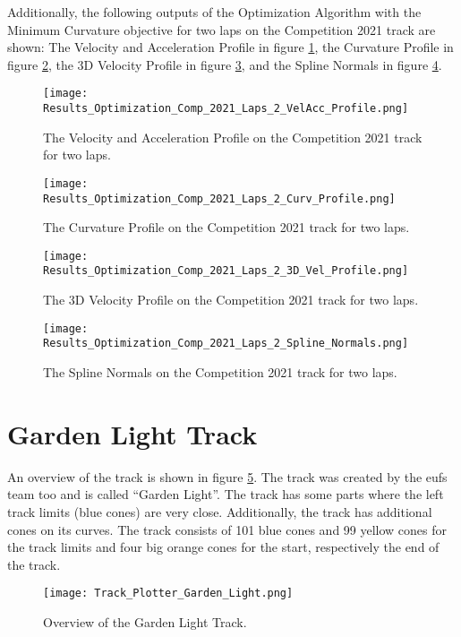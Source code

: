 Additionally, the following outputs of the Optimization Algorithm with the Minimum Curvature objective for two laps on the Competition 2021 track are shown: The Velocity and Acceleration Profile in figure \ref{fig:Results Comp 2021 Laps 2 VelAcc Profile}, the Curvature Profile in figure \ref{fig:Results Comp 2021 Laps 2 Curv Profile}, the 3D Velocity Profile in figure \ref{fig:Results Comp 2021 Laps 2 3D Vel Profile}, and the Spline Normals in figure \ref{fig:Results Comp 2021 Laps 2 Spline Normals}.
\begin{figure}[H]
    \centering
    \texttt{[image: Results\_Optimization\_Comp\_2021\_Laps\_2\_VelAcc\_Profile.png]}
    \caption{The Velocity and Acceleration Profile on the Competition 2021 track for two laps.}
    \label{fig:Results Comp 2021 Laps 2 VelAcc Profile}
\end{figure}
\begin{figure}[H]
    \centering
    \texttt{[image: Results\_Optimization\_Comp\_2021\_Laps\_2\_Curv\_Profile.png]}
    \caption{The Curvature Profile on the Competition 2021 track for two laps.}
    \label{fig:Results Comp 2021 Laps 2 Curv Profile}
\end{figure}
\begin{figure}[H]
    \centering
    \texttt{[image: Results\_Optimization\_Comp\_2021\_Laps\_2\_3D\_Vel\_Profile.png]}
    \caption{The 3D Velocity Profile on the Competition 2021 track for two laps.}
    \label{fig:Results Comp 2021 Laps 2 3D Vel Profile}
\end{figure}
\begin{figure}[H]
    \centering
    \texttt{[image: Results\_Optimization\_Comp\_2021\_Laps\_2\_Spline\_Normals.png]}
    \caption{The Spline Normals on the Competition 2021 track for two laps.}
    \label{fig:Results Comp 2021 Laps 2 Spline Normals}
\end{figure}

\section{Garden Light Track} \label{sec:Results Garden Light Track}
An overview of the track is shown in figure \ref{fig:Results Garden Light Initial}. The track was created by the \acrshort{eufs} team too and is called ``Garden Light''. \cite{eufs_sim_gitlab} The track has some parts where the left track limits (blue cones) are very close. Additionally, the track has additional cones on its curves. The track consists of 101 blue cones and 99 yellow cones for the track limits and four big orange cones for the start, respectively the end of the track.
\begin{figure}[H]
    \centering
    \texttt{[image: Track\_Plotter\_Garden\_Light.png]}
    \caption{Overview of the Garden Light Track.}
    \label{fig:Results Garden Light Initial}
\end{figure}

